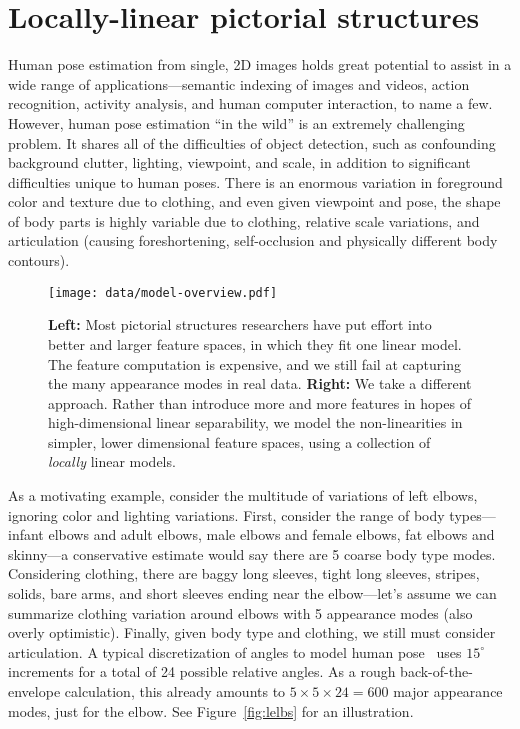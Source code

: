 \chapter{Locally-linear pictorial structures}
Human pose estimation from single, 2D images holds great potential to assist in 
a wide range of applications---semantic indexing of images and videos, action 
recognition, activity analysis, and human computer interaction, to name a few.
However, human pose estimation ``in the wild'' is an extremely challenging 
problem.  It shares all of the difficulties of object detection, such as 
confounding background clutter, lighting, viewpoint, and scale, in addition to
significant difficulties unique to human poses.  There is an enormous 
variation in foreground color and texture due to clothing, and even given 
viewpoint and pose, the shape of body parts is highly variable due to clothing, 
relative scale variations, and articulation (causing foreshortening, 
self-occlusion and physically different body contours).

\begin{figure}[t!]
\centering
\texttt{[image: data/model-overview.pdf]}
\caption{\small \label{fig:overview} \textbf{Left:} Most pictorial structures 
researchers have put effort into better and larger feature spaces, in which 
they fit one linear model.  The feature computation is expensive, and we still 
fail at capturing the many appearance modes in real data.  \textbf{Right:} We 
take a different approach.  Rather than introduce more and more features in 
hopes of high-dimensional linear separability, we model the non-linearities in 
simpler, lower dimensional feature spaces, using a collection of {\em locally} 
linear models.}
\end{figure}


As a motivating example, consider the multitude of variations of left elbows, 
ignoring color and lighting variations.  First, consider the range of body 
types---infant elbows and adult elbows, male elbows and female elbows, fat 
elbows and skinny---a conservative estimate would say there are 5 coarse body 
type modes.  Considering clothing, there are baggy long sleeves, tight long 
sleeves, stripes, solids, bare arms, and short sleeves ending near the 
elbow---let's assume we can summarize clothing variation around elbows with 5 
appearance modes (also overly optimistic).  Finally, given body type and 
clothing, we still must consider articulation.  A typical discretization of 
angles to model human pose~\cite{felzps,devacrf,eichner09,sapp2010cascades} 
uses $15^\circ$ increments for a total of 24 possible relative angles.  As a 
rough back-of-the-envelope calculation, this already amounts to $5 \times 5 
\times 24 = 600$ major appearance modes, just for the elbow.  See 
Figure~\ref{fig:lelbs} for an illustration.

